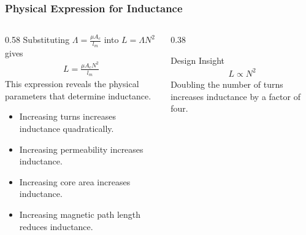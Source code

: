 \begin{frame} 
    \frametitle{Physical Expression for Inductance} 
    \begin{columns} 
        \begin{column}{0.58\textwidth} 
            Substituting 
                $\Lambda=\frac{\mu A_c}{l_m}$ 
            into $
                L=\Lambda N^2 $
            gives 
            \begin{align} 
                L= \frac{\mu A_c N^2}{l_m} 
            \end{align} 
            This expression reveals the physical parameters that determine inductance. 
            \vspace{0.15cm} 
            \begin{itemize} 
                \item Increasing turns increases inductance quadratically. 
                \item Increasing permeability increases inductance. 
                \item Increasing core area increases inductance. 
                \item Increasing magnetic path length reduces inductance. 
            \end{itemize} 
        \end{column} 
        \begin{column}{0.38\textwidth} 
            \begin{block}{Design Insight} 
                \begin{align} 
                    L \propto N^2 
                \end{align} 
                Doubling the number of turns increases inductance by a factor of four. 
            \end{block} 
        \end{column} 
    \end{columns} 
\end{frame}


